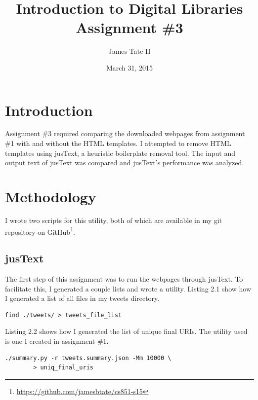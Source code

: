 \documentclass[a4paper,12pt]{article}
\begin{document}
\renewcommand{\thelstlisting}{\thesection.\arabic{lstlisting}}
\renewcommand{\thefigure}{\arabic{section}.\arabic{figure}}
\renewcommand{\thetable}{\arabic{section}.\arabic{table}}
\setlength{\floatsep}{0pt plus 2pt minus 2pt}

\title{Introduction to Digital Libraries Assignment \#3}
\date{March 31, 2015}
\author{James Tate II}
\maketitle

\section{Introduction}
Assignment \#3 required comparing the downloaded webpages from assignment \#1 with and without the HTML
templates\cite{hw1}.
I attempted to remove HTML templates using jusText, a heuristic boilerplate removal tool\cite{justext}. The input
and output text of jusText was compared and jusText's performance was analyzed.

\section{Methodology}
I wrote two scripts for this utility, both of which are available in my git repository on
GitHub\footnote{\url{https://github.com/jamesbtate/cs851-s15}}.

\subsection{jusText}
The first step of this assignment was to run the webpages through jusText. To facilitate this, I generated a couple
lists and wrote a utility. Listing 2.1 show how I generated a list of all files in my tweets directory.

\begin{lstlisting}[basicstyle=\ttfamily,caption={Generating list of files in tweets directory}]
    find ./tweets/ > tweets_file_list
\end{lstlisting}

Listing 2.2 shows how I generated the list of unique final URIs. The utility used is one I created in assignment
\#1.

\begin{lstlisting}[basicstyle=\ttfamily,caption={Generating list of unique final URIs}]
    ./summary.py -r tweets.summary.json -Mm 10000 \
        > uniq_final_uris
\end{lstlisting}
\end{document}
